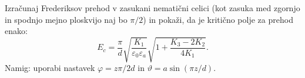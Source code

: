 \begin{naloga}
Izračunaj Frederiksov prehod v zasukani nematični celici (kot zasuka med zgornjo in spodnjo 
mejno ploskvijo naj bo $\pi/2$) in pokaži, da je kritično polje za prehod enako:
\begin{equation}
E_c =  \frac{\pi}{d}\sqrt{\frac{K_1}{\varepsilon_0\varepsilon_a}}
\sqrt{1 + \frac{K_3-2K_2}{4K_1}}.
\end{equation}
Namig: uporabi nastavek $\varphi = z \pi/2d$ in $\vartheta = a \sin(\pi z/d)$. 
\end{naloga}
